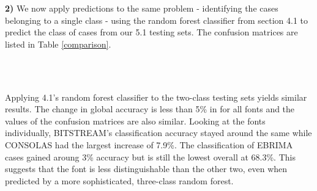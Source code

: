 \documentclass{homework}
\begin{document}
\textbf{2)} We now apply predictions to the same problem - identifying the cases belonging to a single class - using the random forest classifier from section 4.1 to predict the class of cases from our 5.1 testing sets. The confusion matrices are listed in Table \ref{comparison}.

\begin{table}[H]
    \centering
    \\
        \\
    \caption{Confusion Matrices for Two-Class Testing Sets with Sec 4.1 Random Forest}
    \label{comparison}
\end{table}

Applying 4.1's random forest classifier to the two-class testing sets yields similar results. The change in global accuracy is less than 5\% in for all fonts and the values of the confusion matrices are also similar. Looking at the fonts individually, BITSTREAM's classification accuracy stayed around the same while CONSOLAS had the largest increase of 7.9\%. The classification of EBRIMA cases gained aroung 3\% accuracy but is still the lowest overall at 68.3\%. This suggests that the font is less distinguishable than the other two, even when predicted by a more sophisticated, three-class random forest.

\newpage

\end{document}
